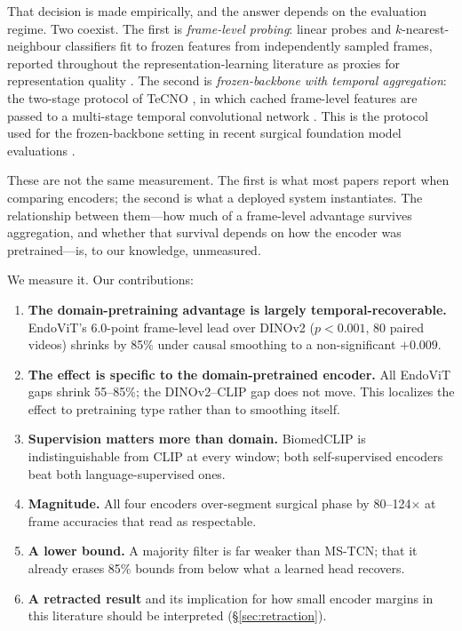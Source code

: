 \documentclass[10pt,twocolumn]{article}
\begin{document}
That decision is made empirically, and the answer depends on the evaluation
regime. Two coexist. The first is \emph{frame-level probing}: linear probes and
$k$-nearest-neighbour classifiers fit to frozen features from independently
sampled frames, reported throughout the representation-learning literature as
proxies for representation quality \citep{ramesh2023dissecting}.
The second is \emph{frozen-backbone with temporal aggregation}: the two-stage
protocol of TeCNO \citep{czempiel2020tecno}, in which cached frame-level
features are passed to a multi-stage temporal convolutional network
\citep{farha2019mstcn}. This is the protocol used for the frozen-backbone
setting in recent surgical foundation model evaluations \citep{zen2026,spencer2026msics}.

These are not the same measurement. The first is what most papers report when
comparing encoders; the second is what a deployed system instantiates. The
relationship between them---how much of a frame-level advantage survives
aggregation, and whether that survival depends on how the encoder was
pretrained---is, to our knowledge, unmeasured.

We measure it. Our contributions:

\begin{enumerate}\itemsep2pt
\item \textbf{The domain-pretraining advantage is largely
temporal-recoverable.} EndoViT's 6.0-point frame-level lead over DINOv2
($p<0.001$, 80 paired videos) shrinks by 85\% under causal smoothing to a
non-significant $+0.009$.
\item \textbf{The effect is specific to the domain-pretrained encoder.} All
EndoViT gaps shrink 55--85\%; the DINOv2--CLIP gap does not move. This
localizes the effect to pretraining type rather than to smoothing itself.
\item \textbf{Supervision matters more than domain.} BiomedCLIP is
indistinguishable from CLIP at every window; both self-supervised encoders beat
both language-supervised ones.
\item \textbf{Magnitude.} All four encoders over-segment surgical phase by
80--124$\times$ at frame accuracies that read as respectable.
\item \textbf{A lower bound.} A majority filter is far weaker than MS-TCN; that
it already erases 85\% bounds from below what a learned head recovers.
\item \textbf{A retracted result} and its implication for how small encoder
margins in this literature should be interpreted (\S\ref{sec:retraction}).
\end{enumerate}
\end{document}
